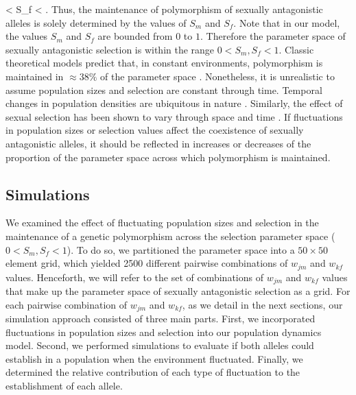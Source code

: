 \documentclass[12pt]{article}
\let\oldequation\equation
\let\oldendequation\endequation
\renewenvironment{equation}
  {\linenomathNonumbers\oldequation}
  {\oldendequation\endlinenomath}
\begin{document}
\begin{equation}
 < S_{f} < 
\label{selection}
\end{equation}
\citep{kidwell1977regions,pamilo1979genic,patten2010fitness,connallon_evolutionary_2018}. Thus, the maintenance of polymorphism of sexually antagonistic alleles is solely determined by the values of $S_{m}$ and $S_{f}$. Note that in our model, the values $S_{m}$ and $S_{f}$ are bounded from $0$ to $1$. Therefore the parameter space of sexually antagonistic selection is within the range $ 0< S_{m}, S_{f} < 1$. Classic theoretical models predict that, in constant environments, polymorphism is maintained in $\approx 38\%$ of the parameter space \citep{kidwell1977regions,pamilo1979genic,connallon_evolutionary_2018}. Nonetheless, it is unrealistic to assume population sizes and selection are constant through time. Temporal changes in population densities are ubiquitous in nature \citep{whitlock1992temporal,connallon2012general,reinhold2000maintenance}. Similarly, the effect of sexual selection has been shown to vary through space and time \citep{kasumovic2008spatial}. If fluctuations in population sizes or selection values affect the coexistence of sexually antagonistic alleles, it should be reflected in increases or decreases of the proportion of the parameter space across which polymorphism is maintained.

\subsection*{Simulations}
We examined the effect of fluctuating population sizes and selection in the maintenance of a genetic polymorphism across the selection parameter space ($0 < S_{m}, S_{f} < 1$). To do so, we partitioned the parameter space into a $50 \times 50$ element grid, which yielded 2500 different pairwise combinations of $w_{jm}$ and $w_{kf}$ values. Henceforth, we will refer to the set of combinations of $w_{jm}$ and $w_{kf}$ values that make up the parameter space of sexually antagonistic selection as a grid. For each pairwise combination of $w_{jm}$ and $w_{kf}$, as we detail in the next sections, our simulation approach consisted of three main parts. First, we incorporated fluctuations in population sizes and selection into our population dynamics model. Second, we performed simulations to evaluate if both alleles could establish in a population when the environment fluctuated. Finally, we determined the relative contribution of each type of fluctuation to the establishment of each allele.
\end{document}
